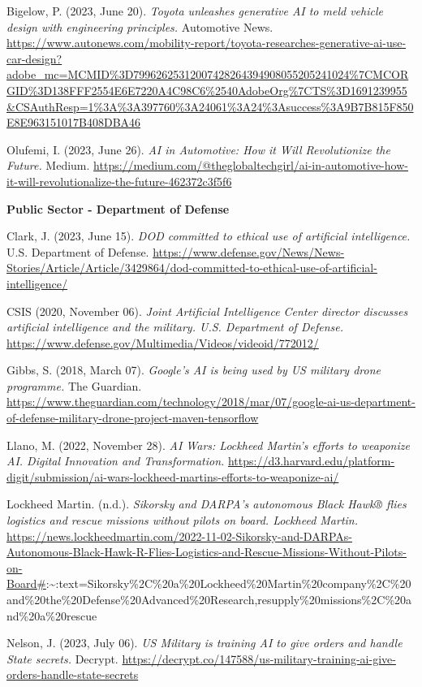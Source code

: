 \documentclass[
]{article}
\begin{document}
Bigelow, P. (2023, June 20). \emph{Toyota unleashes generative AI to meld vehicle design with engineering principles.} Automotive News. \url{https://www.autonews.com/mobility-report/toyota-researches-generative-ai-use-car-design?adobe_mc=MCMID\%3D79962625312007428264394908055205241024\%7CMCORGID\%3D138FFF2554E6E7220A4C98C6\%2540AdobeOrg\%7CTS\%3D1691239955\&CSAuthResp=1\%3A\%3A397760\%3A24061\%3A24\%3Asuccess\%3A9B7B815F850E8E963151017B408DBA46}

Olufemi, I. (2023, June 26). \emph{AI in Automotive: How it Will Revolutionize the Future.} Medium. \url{https://medium.com/@theglobaltechgirl/ai-in-automotive-how-it-will-revolutionalize-the-future-462372c3f5f6}

\textbf{Public Sector - Department of Defense}

Clark, J. (2023, June 15). \emph{DOD committed to ethical use of artificial intelligence.} U.S. Department of Defense. \url{https://www.defense.gov/News/News-Stories/Article/Article/3429864/dod-committed-to-ethical-use-of-artificial-intelligence/}

CSIS (2020, November 06). \emph{Joint Artificial Intelligence Center director discusses artificial intelligence and the military. U.S. Department of Defense.} \url{https://www.defense.gov/Multimedia/Videos/videoid/772012/}

Gibbs, S. (2018, March 07). \emph{Google's AI is being used by US military drone programme.} The Guardian. \url{https://www.theguardian.com/technology/2018/mar/07/google-ai-us-department-of-defense-military-drone-project-maven-tensorflow}

Llano, M. (2022, November 28). \emph{AI Wars: Lockheed Martin's efforts to weaponize AI. Digital Innovation and Transformation.} \url{https://d3.harvard.edu/platform-digit/submission/ai-wars-lockheed-martins-efforts-to-weaponize-ai/}

Lockheed Martin. (n.d.). \emph{Sikorsky and DARPA's autonomous Black Hawk® flies logistics and rescue missions without pilots on board. Lockheed Martin.} \url{https://news.lockheedmartin.com/2022-11-02-Sikorsky-and-DARPAs-Autonomous-Black-Hawk-R-Flies-Logistics-and-Rescue-Missions-Without-Pilots-on-Board\#}:\textasciitilde:text=Sikorsky\%2C\%20a\%20Lockheed\%20Martin\%20company\%2C\%20and\%20the\%20Defense\%20Advanced\%20Research,resupply\%20missions\%2C\%20and\%20a\%20rescue

Nelson, J. (2023, July 06). \emph{US Military is training AI to give orders and handle State secrets.} Decrypt. \url{https://decrypt.co/147588/us-military-training-ai-give-orders-handle-state-secrets}
\end{document}
